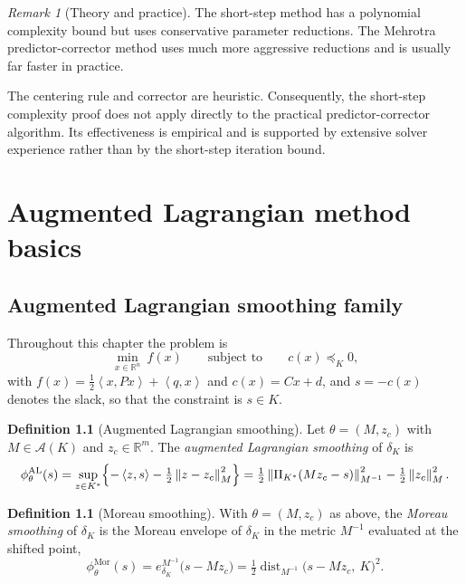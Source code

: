 \documentclass[a4paper,11pt]{book}
\theoremstyle{plain}
\theoremstyle{definition}
\newtheorem{definition}[theorem]{Definition}
\theoremstyle{remark}
\newtheorem{remark}[theorem]{Remark}
\numberwithin{equation}{chapter}
\numberwithin{algorithm}{chapter}
\newcommand{\R}{\mathbb{R}}
\newcommand{\proj}[2]{\Pi_{#2}\!\left(#1\right)}
\newcommand{\norm}[1]{\left\|#1\right\|}
\newcommand{\inner}[2]{\left\langle #1, #2 \right\rangle}
\DeclareMathOperator{\dist}{dist}
\begin{document}
	\begin{remark}[Theory and practice]
		The short-step method has a polynomial complexity bound but uses conservative
		parameter reductions. The Mehrotra predictor-corrector method uses much more
		aggressive reductions and is usually far faster in practice.
		
		The centering rule and corrector are heuristic. Consequently, the short-step
		complexity proof does not apply directly to the practical predictor-corrector
		algorithm. Its effectiveness is empirical and is supported by extensive
		solver experience rather than by the short-step iteration bound.
	\end{remark}
	
	\chapter{Augmented Lagrangian method basics}
	
	\section{Augmented Lagrangian smoothing family}
	
	Throughout this chapter the problem is
	\begin{equation}
		\min_{x\in\R^n}\ f(x)
		\qquad\text{subject to}\qquad
		c(x)\preceq_K0 ,
	\end{equation}
	with $f(x)=\tfrac12\inner{x}{Px}+\inner{q}{x}$ and $c(x)=Cx+d$, and $s=-c(x)$
	denotes the slack, so that the constraint is $s\in K$.
	
	\begin{definition}[Augmented Lagrangian smoothing]
		Let $\theta=(M,z_c)$ with $M\in\mathcal{A}(K)$ and $z_c\in\R^m$. The
		\emph{augmented Lagrangian smoothing} of $\delta_K$ is
		\begin{equation}
			\phi^{\mathrm{AL}}_\theta(s)
			=\sup_{z\in K^*}\Bigl\{-\inner{z}{s}-\tfrac12\norm{z-z_c}^2_M\Bigr\}
			=\tfrac12\norm{\proj{Mz_c-s}{K^*}}^2_{M^{-1}}
			-\tfrac12\norm{z_c}^2_M .
		\end{equation}
	\end{definition}
	
	\begin{definition}[Moreau smoothing]
		With $\theta=(M,z_c)$ as above, the \emph{Moreau smoothing} of $\delta_K$ is
		the Moreau envelope of $\delta_K$ in the metric $M^{-1}$ evaluated at the
		shifted point,
		\begin{equation}
			\phi^{\mathrm{Mor}}_\theta(s)
			=e^{M^{-1}}_{\delta_K}\bigl(s-Mz_c\bigr)
			=\tfrac12\dist_{M^{-1}}\bigl(s-Mz_c,\ K\bigr)^2 .
		\end{equation}
	\end{definition}
	
\end{document}
